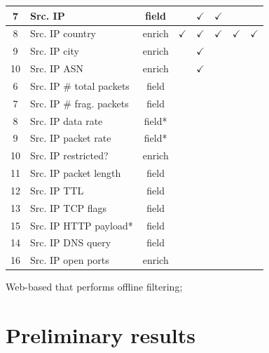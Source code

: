 \documentclass{llncs}
\begin{document}
\begin{table}[h!]
\begin{tabular}{|c| l | c |c|c|c|c|c|}
7&Src.  IP &field& ~ &$\checkmark$ & $\checkmark$& ~ & ~    \\ \hline 
8&Src. IP country	&enrich&$\checkmark$ & $\checkmark$ & $\checkmark$& $\checkmark$ & $\checkmark$   \\
\hline    
9&Src.  IP city &enrich& ~ & $\checkmark$	& ~ & ~ & ~   \\  \hline
10&Src. IP ASN &enrich& ~ & $\checkmark$	& ~ & ~ & ~ \\ \hline 
6&Src. IP \# total packets&field&&&&&\\ \hline
7&Src. IP \# frag. packets  &field&&&&&\\ \hline 
8&Src. IP data rate & field*&&&&&\\ \hline
9&Src. IP packet rate & field* &&&&&\\ \hline
10&Src. IP restricted?  &enrich&&&&& \\ \hline 
11&Src. IP packet length &field &&&&&\\ \hline 
12&Src. IP TTL  &field &&&&&\\ \hline
\rowcolor{yellow}13&Src. IP TCP flags &field &&&&&\\ \hline 
\rowcolor{yellow}15&Src. IP HTTP payload* & field&&&&&\\ \hline
\rowcolor{yellow}14&Src. IP DNS query  & field&&&&&\\ \hline 
\rowcolor{yellow}16&Src. IP open ports &enrich&&&&&\\ \hline 

\end{tabular} 
\end{table}






Web-based that performs offline filtering;




\section{Preliminary results}
\end{document}
